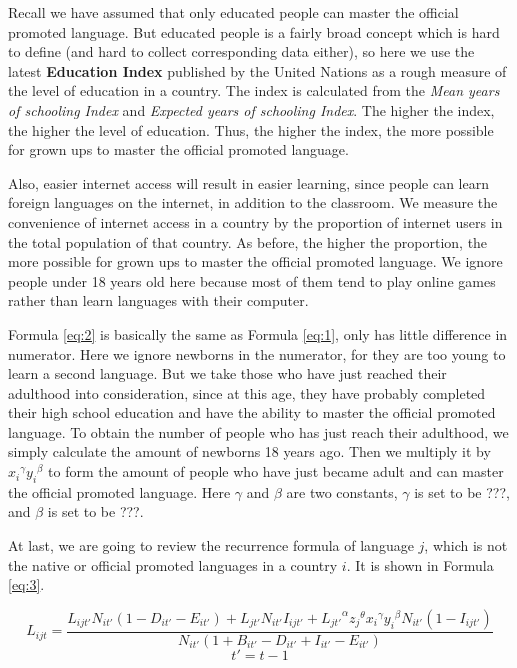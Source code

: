 \documentclass{mcmthesis}
\begin{document}
Recall we have assumed that only educated people can master the official promoted language. But educated people is a fairly broad concept which is hard to define (and hard to collect corresponding data either), so here we use the latest \textbf{Education Index} published by the United Nations as a rough measure of the level of education in a country. The index is calculated from the \textit{Mean years of schooling Index} and \textit{Expected years of schooling Index}. The higher the index, the higher the level of education. Thus, the higher the index, the more possible for grown ups to master the official promoted language.

Also, easier internet access will result in easier learning, since people can learn foreign languages on the internet, in addition to the classroom. We measure the convenience of internet access in a country by the proportion of internet users in the total population of that country. As before, the higher the proportion, the more possible for grown ups to master the official promoted language. We ignore people under 18 years old here because most of them tend to play online games rather than learn languages with their computer.

Formula \ref{eq:2} is basically the same as Formula \ref{eq:1}, only has little difference in numerator. Here we ignore newborns in the numerator, for they are too young to learn a second language. But we take those who have just reached their adulthood into consideration, since at this age, they have probably completed their high school education and have the ability to master the official promoted language. To obtain the number of people who has just reach their adulthood, we simply calculate the amount of newborns 18 years ago. Then we multiply it by ${x_i}^\gamma {y_i}^\beta$ to form the amount of people who have just became adult and can master the official promoted language. Here $\gamma$ and $\beta$ are two constants, $\gamma$ is set to be ???, and $\beta$ is set to be ???.

At last, we are going to review the recurrence formula of language $j$, which is not the native or official promoted languages in a country $i$. It is shown in Formula \ref{eq:3}.

\begin{equation} \label{eq:3}
    L_{ijt}=\frac{L_{ijt'}N_{it'}(1-D_{it'}-E_{it'})+L_{jt'}N_{it'}I_{ijt'}+{L_{jt'}}^\alpha {z_j}^\theta {x_i}^\gamma {y_i}^\beta N_{it'} (1-I_{ijt'})}{N_{it'}(1+B_{it'}-D_{it'}+I_{it'}-E_{it'})}
\end{equation}
 \begin{equation*}
    t'=t-1
\end{equation*}
\end{document}
